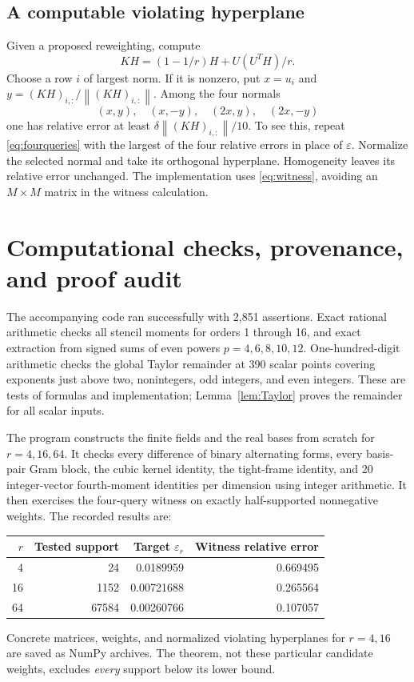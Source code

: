 \documentclass[11pt,letterpaper]{article}
\theoremstyle{definition}
\theoremstyle{remark}
\numberwithin{equation}{section}
\newcommand{\eps}{\varepsilon}
\newcommand{\norm}[1]{\left\lVert#1\right\rVert}
\begin{document}
\subsection{A computable violating hyperplane}
Given a proposed reweighting, compute
\begin{equation}\label{eq:witness}
 KH=(1-1/r)H+U(U^TH)/r.
\end{equation}
Choose a row $i$ of largest norm. If it is nonzero, put $x=u_i$ and $y=(KH)_{i,:}/\norm{(KH)_{i,:}}$. Among the four normals
\[
 (x,y),\quad(x,-y),\quad(2x,y),\quad(2x,-y)
\]
one has relative error at least $\delta\norm{(KH)_{i,:}}/10$. To see this, repeat \eqref{eq:fourqueries} with the largest of the four relative errors in place of $\eps$. Normalize the selected normal and take its orthogonal hyperplane. Homogeneity leaves its relative error unchanged. The implementation uses \eqref{eq:witness}, avoiding an $M\times M$ matrix in the witness calculation.

\section{Computational checks, provenance, and proof audit}\label{sec:checks}
The accompanying code ran successfully with 2,851 assertions. Exact rational arithmetic checks all stencil moments for orders 1 through 16, and exact extraction from signed sums of even powers $p=4,6,8,10,12$. One-hundred-digit arithmetic checks the global Taylor remainder at 390 scalar points covering exponents just above two, nonintegers, odd integers, and even integers. These are tests of formulas and implementation; Lemma~\ref{lem:Taylor} proves the remainder for all scalar inputs.

The program constructs the finite fields and the real bases from scratch for $r=4,16,64$. It checks every difference of binary alternating forms, every basis-pair Gram block, the cubic kernel identity, the tight-frame identity, and 20 integer-vector fourth-moment identities per dimension using integer arithmetic. It then exercises the four-query witness on exactly half-supported nonnegative weights. The recorded results are:
\begin{center}
\begin{tabular}{rrrr}
\toprule
$r$ & Tested support & Target $\eps_r$ & Witness relative error\\
\midrule
4 & 24 & 0.0189959 & 0.669495\\
16 & 1152 & 0.00721688 & 0.265564\\
64 & 67584 & 0.00260766 & 0.107057\\
\bottomrule
\end{tabular}
\end{center}
Concrete matrices, weights, and normalized violating hyperplanes for $r=4,16$ are saved as NumPy archives. The theorem, not these particular candidate weights, excludes \emph{every} support below its lower bound.
\end{document}
